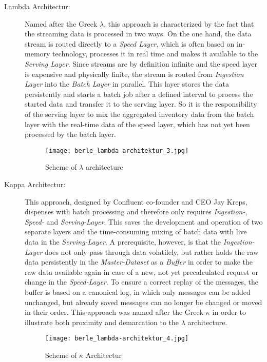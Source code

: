 \begin{description}
\item [Lambda Architectur:] Named after the Greek $\lambda$, this approach is characterized by the fact that the streaming data is processed in two ways.
On the one hand, the data stream is routed directly to a \textit{Speed Layer}, which is often based on in-memory technology,
processes it in real time and makes it available to the \textit{Serving Layer}.
Since streams are by definition infinite and the speed layer is expensive and physically finite,
the stream is routed from \textit{Ingestion Layer} into the \textit{Batch Layer} in parallel.
This layer stores the data persistently and starts a batch job after a defined interval to process the started data and transfer it to the serving layer.
So it is the responsibility of the serving layer to mix the aggregated inventory data from the batch layer with the real-time data of the speed layer,
which has not yet been processed by the batch layer.\cite{lambda} \cite{jaxkappa}

\begin{figure}[h]
	\centering
	\texttt{[image: berle\_lambda-architektur\_3.jpg]}
	\caption[Scheme of $\lambda$ architecture]{Scheme of $\lambda$ architecture\cite{jaxkappa}}
	\label{fig:KafkaArchitecture}
\end{figure}


\item [Kappa Architectur:] This approach, designed by Confluent co-founder and CEO Jay Kreps, dispenses with batch processing and therefore only requires
\textit{Ingestion-}, \textit{Speed-} and \textit{Serving-Layer}.
This saves the development and operation of two separate layers and the time-consuming mixing of batch data with live data in the \textit{Serving-Layer}.
A prerequisite, however, is that the \textit{Ingestion-Layer} does not only pass through data volatilely,
but rather holds the raw data persistently in the \textit{Master-Dataset} as a \textit{Buffer} in order to make the raw data available again in case of a new,
not yet precalculated request or change in the \textit{Speed-Layer}.
To ensure a correct replay of the messages, the buffer is based on a canonical log, in which only messages can be added unchanged, but already saved messages can no
longer be changed or moved in their order.
This approach was named after the Greek $\kappa$ in order to illustrate both proximity and demarcation to the $\lambda$ architecture.
\cite{Kappa} \cite{Kappa2}

\begin{figure}[h]
	\centering
	\texttt{[image: berle\_lambda-architektur\_4.jpg]}
	\caption[Scheme of $\kappa$ Architectur]{Scheme of $\kappa$ Architectur\cite{jaxkappa}}
	\label{fig:KappaArchitecture}
\end{figure}

\end{description}

